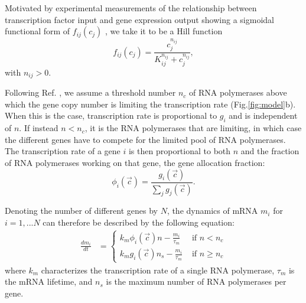 \documentclass[10pt]{article}
\begin{document}
Motivated by experimental measurements of the relationship between transcription factor input and gene expression output showing a sigmoidal functional form of $f_{ij}(c_j)$ \cite{kuhlman2007combinatorial, kim2008quantitative}, we take it to be a Hill function
\begin{equation}
    f_{ij}(c_j) =  \frac{c_j^{n_{ij}}}{K_{ij}^{n_{ij}}+c_j^{n_{ij}}},
    \label{eqn:fijexpression}
\end{equation}
with $n_{ij}>0$. 

Following Ref. \cite{lin2018homeostasis}, we assume a threshold number $n_c$ of RNA polymerases above which the gene copy number is limiting the transcription rate (Fig.\ref{fig:model}b). When this is the case, transcription rate is proportional to $g_i$ and is independent of $n$. If instead $n<n_c$, it is the RNA polymerases that are limiting, in which case the different genes have to compete for the limited pool of RNA polymerases. The transcription rate of a gene $i$ is then proportional to both $n$ and the fraction of RNA polymerases working on that gene, the gene allocation fraction:
\begin{equation}
    \phi_i(\vec{c})= \frac{g_i(\vec{c})}{\sum_j g_j(\vec{c})}.  \label{eqn:phidef}
\end{equation}

Denoting the number of different genes by $N$, the dynamics of mRNA $m_i$ for $i = 1,...N$ can therefore be described by the following equation:
\begin{equation}
\begin{split}
    \frac{dm_i}{dt} &= \begin{cases}
    k_m \phi_i(\vec{c})n - \frac{m_i}{\tau_m} & \text{ if $n<n_c$}
    \\
    k_m g_i(\vec{c})n_s - \frac{m_i}{\tau_m} & \text{ if $n \geq n_c$}
    \end{cases}
    \label{eqn:dmdt}
\end{split}
\end{equation}
where $k_m$ characterizes the transcription rate of a single RNA polymerase, $\tau_m$ is the mRNA lifetime, and $n_s$ is the maximum number of RNA polymerases per gene.
\end{document}
